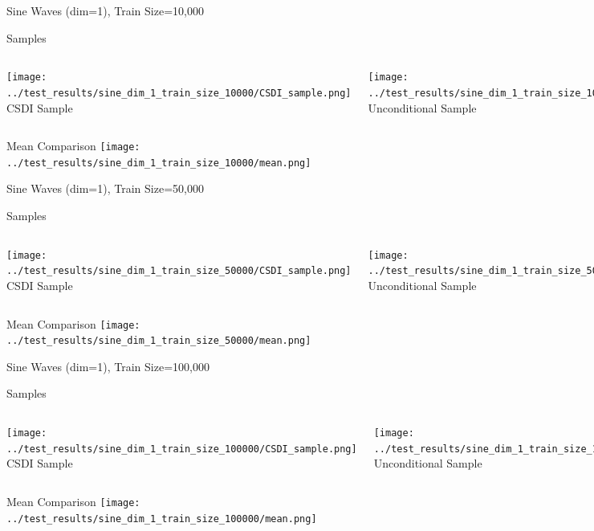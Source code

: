 \documentclass[8pt]{beamer}
\renewcommand{\|}{\ensuremath{\hspace{0.1cm} | \hspace{0.1cm}}}
\begin{document}
    \begin{frame}{Sine Waves (dim=1), Train Size=10,000}
    \begin{block}{Samples}
    \begin{columns}
        \centering
        \texttt{[image: ../test\_results/sine\_dim\_1\_train\_size\_10000/CSDI\_sample.png]}
        CSDI Sample
        
        \centering
        \texttt{[image: ../test\_results/sine\_dim\_1\_train\_size\_10000/UNCOND\_sample.png]}
        Unconditional Sample
    \end{columns}
    \end{block}

    \begin{block}{Mean Comparison}
    \centering
    \texttt{[image: ../test\_results/sine\_dim\_1\_train\_size\_10000/mean.png]}
    \end{block}
    \end{frame}

    \begin{frame}{Sine Waves (dim=1), Train Size=50,000}
    \begin{block}{Samples}
    \begin{columns}
        \centering
        \texttt{[image: ../test\_results/sine\_dim\_1\_train\_size\_50000/CSDI\_sample.png]}
        CSDI Sample
        
        \centering
        \texttt{[image: ../test\_results/sine\_dim\_1\_train\_size\_50000/UNCOND\_sample.png]}
        Unconditional Sample
    \end{columns}
    \end{block}

    \begin{block}{Mean Comparison}
    \centering
    \texttt{[image: ../test\_results/sine\_dim\_1\_train\_size\_50000/mean.png]}
    \end{block}
    \end{frame}

    \begin{frame}{Sine Waves (dim=1), Train Size=100,000}
    \begin{block}{Samples}
    \begin{columns}
        \centering
        \texttt{[image: ../test\_results/sine\_dim\_1\_train\_size\_100000/CSDI\_sample.png]}
        CSDI Sample
        
        \centering
        \texttt{[image: ../test\_results/sine\_dim\_1\_train\_size\_100000/UNCOND\_sample.png]}
        Unconditional Sample
    \end{columns}
    \end{block}

    \begin{block}{Mean Comparison}
    \centering
    \texttt{[image: ../test\_results/sine\_dim\_1\_train\_size\_100000/mean.png]}
    \end{block}
    \end{frame}
\end{document}
